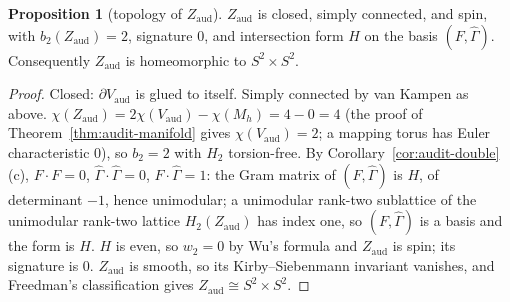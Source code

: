 \documentclass[11pt]{article}
\theoremstyle{definition}
\newtheorem{proposition}[theorem]{Proposition}
\begin{document}
\begin{proposition}[topology of $Z_{\mathrm{aud}}$]\label{prop:Z-topology}
$Z_{\mathrm{aud}}$ is closed, simply connected, and spin, with
$b_2(Z_{\mathrm{aud}})=2$, signature $0$, and intersection form $H$ on the
basis $(F,\hat\Gamma)$.  Consequently $Z_{\mathrm{aud}}$ is homeomorphic to
$S^2\times S^2$.
\end{proposition}

\begin{proof}
Closed: $\partial V_{\mathrm{aud}}$ is glued to itself.  Simply connected
by van Kampen as above.  $\chi(Z_{\mathrm{aud}})=2\chi(V_{\mathrm{aud}})-\chi(M_h)=4-0=4$
(the proof of Theorem~\ref{thm:audit-manifold} gives
$\chi(V_{\mathrm{aud}})=2$; a mapping torus has Euler characteristic $0$),
so $b_2=2$ with $H_2$ torsion-free.  By
Corollary~\ref{cor:audit-double}(c), $F\cdot F=0$, $\hat\Gamma\cdot\hat\Gamma=0$,
$F\cdot\hat\Gamma=1$: the Gram matrix of $(F,\hat\Gamma)$ is $H$, of
determinant $-1$, hence unimodular; a unimodular rank-two sublattice of the
unimodular rank-two lattice $H_2(Z_{\mathrm{aud}})$ has index one, so
$(F,\hat\Gamma)$ is a basis and the form is $H$.  $H$ is even, so
$w_2=0$ by Wu's formula and $Z_{\mathrm{aud}}$ is spin; its signature is
$0$.  $Z_{\mathrm{aud}}$ is smooth, so its Kirby--Siebenmann invariant
vanishes, and Freedman's classification gives
$Z_{\mathrm{aud}}\cong S^2\times S^2$.
\end{proof}
\end{document}
